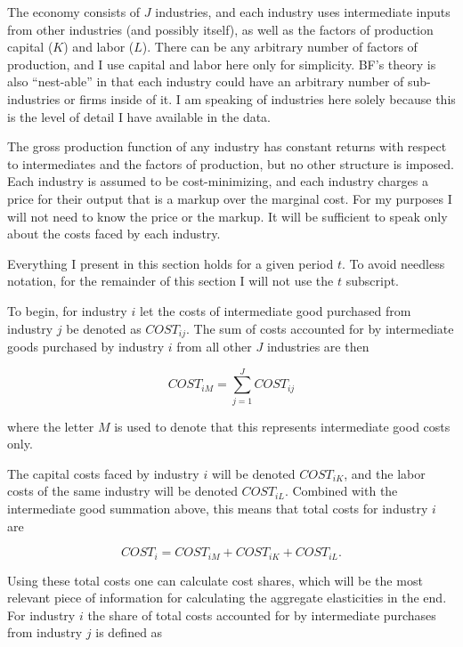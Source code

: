 \documentclass[11pt]{article}
\begin{document}
The economy consists of $J$ industries, and each industry uses intermediate inputs from other industries (and possibly itself), as well as the factors of production capital ($K$) and labor ($L$). There can be any arbitrary number of factors of production, and I use capital and labor here only for simplicity. BF's theory is also ``nest-able'' in that each industry could have an arbitrary number of sub-industries or firms inside of it. I am speaking of industries here solely because this is the level of detail I have available in the data. 

The gross production function of any industry has constant returns with respect to intermediates and the factors of production, but no other structure is imposed. Each industry is assumed to be cost-minimizing, and each industry charges a price for their output that is a markup over the marginal cost. For my purposes I will not need to know the price or the markup. It will be sufficient to speak only about the costs faced by each industry.

Everything I present in this section holds for a given period $t$. To avoid needless notation, for the remainder of this section I will not use the $t$ subscript. 

To begin, for industry $i$ let the costs of intermediate good purchased from industry $j$ be denoted as $COST_{ij}$. The sum of costs accounted for by intermediate goods purchased by industry $i$ from all other $J$ industries are then

\begin{equation}
	COST_{iM} = \sum_{j=1}^{J} COST_{ij}
\end{equation}

where the letter $M$ is used to denote that this represents intermediate good costs only.

The capital costs faced by industry $i$ will be denoted $COST_{iK}$, and the labor costs of the same industry will be denoted $COST_{iL}$. Combined with the intermediate good summation above, this means that total costs for industry $i$ are

\begin{equation}
	COST_i = COST_{iM} + COST_{iK} + COST_{iL}. \label{EQ_costi}
\end{equation}

Using these total costs one can calculate cost shares, which will be the most relevant piece of information for calculating the aggregate elasticities in the end. For industry $i$ the share of total costs accounted for by intermediate purchases from industry $j$ is defined as
\end{document}
